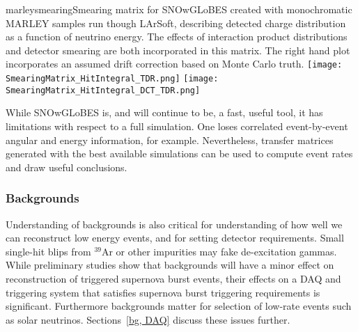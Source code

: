 

\begin{dunefigure}{marleysmearing}{Smearing matrix for
    SNOwGLoBES created with monochromatic MARLEY samples run though
    LArSoft, describing detected charge distribution as a function of
    neutrino energy.  The effects of interaction product distributions
  and detector smearing are both incorporated in this matrix.  The
  right hand plot 
  incorporates an assumed drift correction based on Monte Carlo truth.}
\texttt{[image: SmearingMatrix\_HitIntegral\_TDR.png]}
\texttt{[image: SmearingMatrix\_HitIntegral\_DCT\_TDR.png]}
\end{dunefigure}


While SNOwGLoBES is, and will continue to be, a fast, useful tool,
it has limitations with respect to a full simulation.  One loses correlated
event-by-event angular and energy information, for example.
Nevertheless, transfer matrices generated with the best available
simulations can be used to compute event rates and draw useful conclusions.


\subsubsection{Backgrounds}

Understanding of backgrounds is also critical for understanding of how
well we can reconstruct low energy events, and for setting detector
requirements.  Small single-hit blips from $^{39}$Ar or other
impurities may fake de-excitation gammas.  While preliminary studies
show that backgrounds will have a minor effect on reconstruction of
triggered supernova burst events, their effects on a DAQ and
triggering system that satisfies supernova burst triggering
requirements is significant.  Furthermore backgrounds matter for
selection of low-rate events such as solar neutrinos.
Sections~\ref{bg, DAQ} discuss these issues further.

